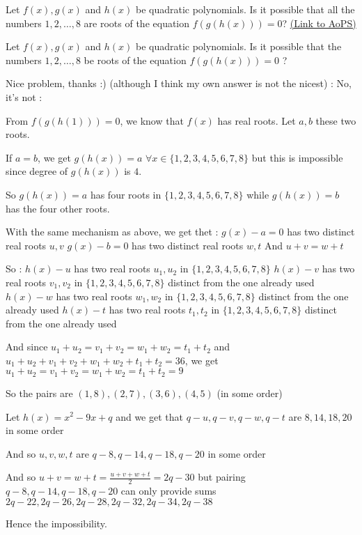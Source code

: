 \begin{problem}
	Let $f(x),g(x)$ and $h(x)$ be quadratic polynomials. Is it possible that all the numbers $1,2,\ldots,8$ are roots of the equation $f(g(h(x)))=0$?
	\flushright \href{https://artofproblemsolving.com/community/c6h362934}{(Link to AoPS)}
\end{problem}



\begin{solution}
	\begin{tcolorbox}Let $f(x),g(x)$ and $h(x)$ be quadratic polynomials. Is it possible that the numbers $1,2,\dots,8$ be roots of the equation $f(g(h(x)))=0$ ?\end{tcolorbox}

Nice problem, thanks :)  (although I think my own answer is not the nicest) :
No, it's not :

From $f(g(h(1)))=0$, we know that $f(x)$ has real roots. Let $a,b$ these two roots.

If $a=b$, we get $g(h(x))=a$ $\forall x\in\{1,2,3,4,5,6,7,8\}$ but this is impossible since degree of $g(h(x))$ is $4$.

So $g(h(x))=a$ has four roots in $\{1,2,3,4,5,6,7,8\}$ while $g(h(x))=b$ has the four other roots.

With the same mechanism as above, we get thet :
$g(x)-a=0$ has two distinct real roots $u,v$
$g(x)-b=0$ has two distinct real roots $w,t$
And $u+v=w+t$

So :
$h(x)-u$ has two real roots $u_1,u_2$ in $\{1,2,3,4,5,6,7,8\}$ 
$h(x)-v$ has two real roots $v_1,v_2$ in $\{1,2,3,4,5,6,7,8\}$ distinct from the one already used
$h(x)-w$ has two real roots $w_1,w_2$ in $\{1,2,3,4,5,6,7,8\}$ distinct from the one already used
$h(x)-t$ has two real roots $t_1,t_2$ in $\{1,2,3,4,5,6,7,8\}$ distinct from the one already used

And since $u_1+u_2=v_1+v_2=w_1+w_2=t_1+t_2$ and $u_1+u_2+v_1+v_2+w_1+w_2+t_1+t_2=36$, we get $u_1+u_2=v_1+v_2=w_1+w_2=t_1+t_2=9$

So the pairs are $(1,8),(2,7),(3,6),(4,5)$ (in some order)

Let $h(x)=x^2-9x+q$ and we get that $q-u,q-v,q-w,q-t$ are $8,14,18,20$ in some order

And so $u,v,w,t$ are $q-8,q-14,q-18,q-20$ in some order

And so $u+v=w+t=\frac{u+v+w+t}2=2q-30$ but pairing $q-8,q-14,q-18,q-20$ can only provide sums $2q-22, 2q-26, 2q-28, 2q-32, 2q-34, 2q-38$

Hence the impossibility.
\end{solution}



